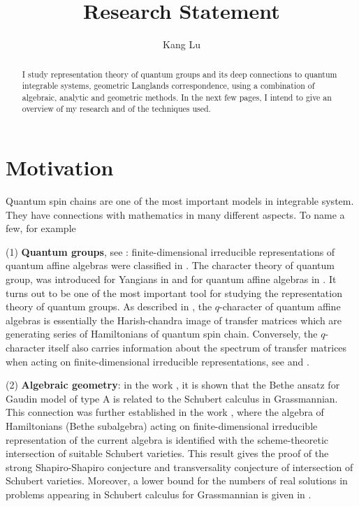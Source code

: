 \documentclass[11pt,reqno]{amsart}
\numberwithin{equation}{section}
\theoremstyle{definition}
\theoremstyle{remark}
\begin{document}
\pagestyle{myheadings}
\setcounter{page}{1}

\title{Research Statement}

\author{Kang Lu}

\maketitle
\thispagestyle{empty}
\begin{abstract}
I study representation theory of quantum groups and its deep connections to quantum integrable systems, geometric Langlands correspondence, using a combination of algebraic, analytic and geometric methods. In the next few pages, I intend to give an overview of my research and of the techniques used.
\end{abstract}
\section{Motivation}
Quantum spin chains are one of the most important models in integrable system. They have connections with mathematics in many different aspects. To name a few, for example 

(1) \textbf{Quantum groups}, see \cite{Dri:1985,CP:1994}: finite-dimensional irreducible representations of quantum affine algebras were classified in \cite{CP:1991,CP:1995}. The character theory of quantum group, was introduced for Yangians in \cite{Knight:1995} and for quantum affine algebras in \cite{FR:1999}. It turns out to be one of the most important tool for studying the representation theory of quantum groups. As described in \cite{FR:1999}, the $q$-character of quantum affine algebras is essentially the Harish-chandra image of transfer matrices which are generating series of Hamiltonians of quantum spin chain. Conversely, the $q$-character itself also carries information about the spectrum of transfer matrices when acting on finite-dimensional irreducible representations, see \cite[Theorem 5.11]{FH:2015} and \cite[Theorem 7.5]{FJMM:2017}.

(2) \textbf{Algebraic geometry}: in the work \cite{MV:2004}, it is shown that the Bethe ansatz for Gaudin model of type A is related to the Schubert calculus in Grassmannian. This connection was further established  in the work \cite{MTV:2009b}, where the algebra of Hamiltonians (Bethe subalgebra) acting on finite-dimensional irreducible representation of the current algebra is identified with the scheme-theoretic intersection of suitable Schubert varieties. This result gives the proof of the strong Shapiro-Shapiro conjecture and transversality conjecture of intersection of Schubert varieties. Moreover, a lower bound for the numbers of real solutions in problems appearing in Schubert calculus for Grassmannian is given in \cite{MT:2016}.
\end{document}
